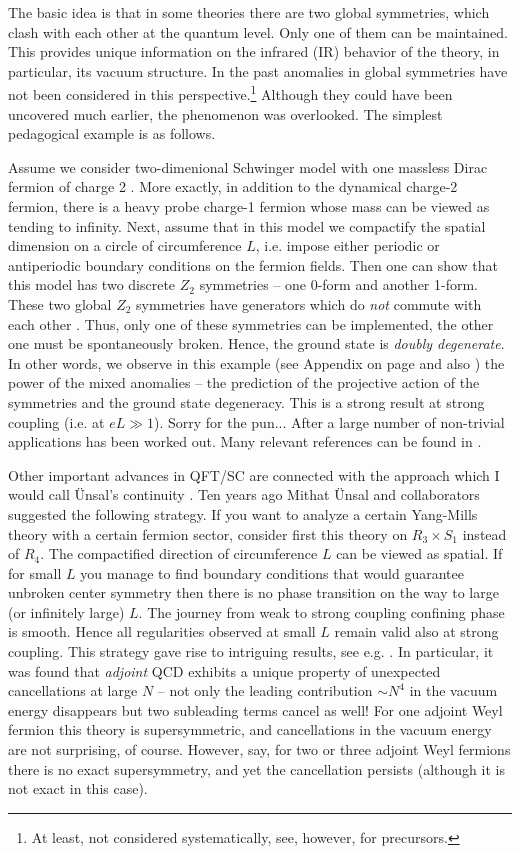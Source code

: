 \documentclass[epsfig,12pt]{article}
\begin{document}
The basic idea is that in some theories there are two global symmetries, which clash with each other at  the quantum level. Only one of them can be maintained. This provides unique information on the infrared (IR) behavior of the theory, in particular, its vacuum structure. In the past anomalies in global symmetries have not been considered in this perspective.\footnote{At least, not considered systematically, see, however, \cite{ss} for precursors.} Although they could have been uncovered much earlier, the phenomenon was overlooked. The simplest  pedagogical example is as follows.

Assume we consider two-dimenional Schwinger model with one massless Dirac fermion of charge 2 \cite{da1}. More exactly, in addition to the dynamical charge-2 fermion, there is a heavy probe charge-1 fermion
whose mass can be viewed as tending to infinity. Next, assume that  in this model we compactify the spatial dimension on a circle of circumference $L$, i.e. impose either periodic or antiperiodic boundary conditions on the fermion fields. Then one can show that this model has two discrete $Z_2$ symmetries -- one 0-form and another 1-form.
These  two global $Z_2$ symmetries have generators which do {\em not} commute with each other \cite{da1}. Thus, only one of these symmetries can be implemented, the other one must be spontaneously broken. Hence, the ground state is {\em doubly degenerate}. In other words, we observe in this example (see Appendix on page \pageref{app} and also \cite{ss}) the
power of the mixed anomalies -- the prediction of the projective action of the
symmetries and the ground state degeneracy.
This is a strong result at strong coupling (i.e. at $eL\gg 1$). Sorry for the pun... After \cite{K1,K2,K3} a large number of non-trivial applications has been worked out.
Many relevant references can be found in \cite{da1,hkt}.

Other important advances in QFT/SC are connected with the approach which I would call  \"Unsal's continuity \cite{mitun} . Ten years ago Mithat \"Unsal and collaborators suggested the following strategy. If you want to analyze a certain Yang-Mills theory with a certain fermion sector, consider first this theory on $R_3\times S_1$ instead of $R_4$. The compactified direction of circumference $L$ can be viewed as spatial. If for small $L$ you manage to find boundary conditions that would guarantee unbroken center symmetry then there is no phase transition on the way to large (or infinitely large) $L$. The journey from weak to strong coupling confining phase is smooth. Hence all regularities observed at small $L$ remain valid also at strong coupling. This strategy gave rise to intriguing results, see e.g. \cite{MU}. In particular, it was found that {\em  adjoint} QCD exhibits a unique property of unexpected cancellations at large $N$ --  not only the leading contribution $\sim N^4$ in the vacuum energy  disappears but two subleading terms cancel as well! For one adjoint Weyl fermion this theory is supersymmetric, and cancellations in the vacuum energy are not surprising, of course. However, say, for two or three adjoint Weyl fermions there is no exact  supersymmetry, and yet the cancellation persists (although it is not exact in this case). 
\end{document}
